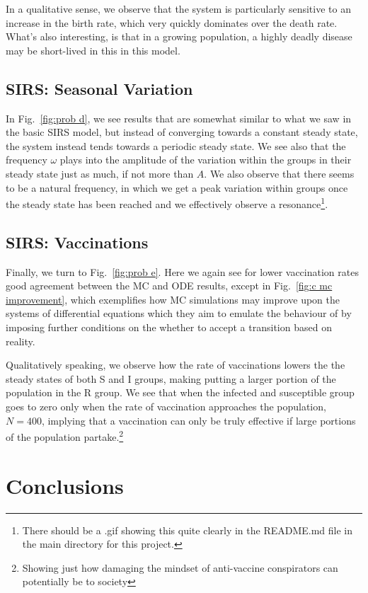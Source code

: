 \documentclass[10pt,showpacs,preprintnumbers,amsmath,amssymb,nofootinbib,aps,prl,twocolumn,groupedaddress,superscriptaddress,showkeys]{revtex4-1}
\begin{document}
    In a qualitative sense, we observe that the system is particularly sensitive to an increase in the birth rate, which very quickly dominates over the death rate. What's also interesting, is that in a growing population, a highly deadly disease may be short-lived in this in this model.

  \subsection{SIRS: Seasonal Variation}
    In Fig.~\ref{fig:prob d}, we see results that are somewhat similar to what we saw in the basic SIRS model, but instead of converging towards a constant steady state, the system instead tends towards a periodic steady state. We see also that the frequency $\omega$ plays into the amplitude of the variation within the groups in their steady state just as much, if not more than $A$. We also observe that there seems to be a natural frequency, in which we get a peak variation within groups once the steady state has been reached and we effectively observe a resonance\footnote{There should be a .gif showing this quite clearly in the README.md file in the main directory for this project.}. 


  \subsection{SIRS: Vaccinations}
    Finally, we turn to Fig.~\ref{fig:prob e}. Here we again see for lower vaccination rates good agreement between the MC and ODE results, except in Fig.~\ref{fig:c mc improvement}, which exemplifies how MC simulations may improve upon the systems of differential equations which they aim to emulate the behaviour of by imposing further conditions on the whether to accept a transition based on reality.

    Qualitatively speaking, we observe how the rate of vaccinations lowers the the steady states of both S and I groups, making putting a larger portion of the  population in the R group. We see that when the infected and susceptible group goes to zero only when the  rate of vaccination approaches the population, $N=400$, implying that a vaccination can only be truly effective if large portions of the population partake.\footnote{Showing just how damaging the mindset of anti-vaccine conspirators can potentially be to society}

\section{Conclusions}
\end{document}

